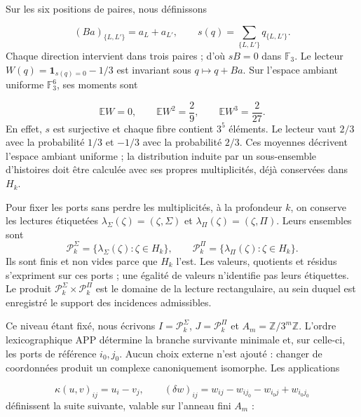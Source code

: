 Sur les six positions de paires, nous définissons

\[
(Ba)_{\{L,L'\}}=a_L+a_{L'},
\qquad
s(q)=\sum_{\{L,L'\}}q_{\{L,L'\}}.
\]
Chaque direction intervient dans trois paires ; d'où \(sB=0\) dans \(\mathbb F_3\). Le lecteur \(W(q)=\mathbf1_{s(q)=0}-1/3\) est invariant sous \(q\mapsto q+Ba\). Sur l'espace ambiant uniforme \(\mathbb F_3^6\), ses moments sont

\[
\mathbb EW=0,\qquad
\mathbb EW^2=\frac29,\qquad
\mathbb EW^3=\frac2{27}.
\]
En effet, \(s\) est surjective et chaque fibre contient \(3^5\) éléments. Le lecteur vaut \(2/3\) avec la probabilité \(1/3\) et \(-1/3\) avec la probabilité \(2/3\). Ces moyennes décrivent l'espace ambiant uniforme ; la distribution induite par un sous-ensemble d'histoires doit être calculée avec ses propres multiplicités, déjà conservées dans \(H_k\).

Pour fixer les ports sans perdre les multiplicités, à la profondeur \(k\), on conserve les lectures étiquetées \(\lambda_\Sigma(\zeta)=(\zeta,\Sigma)\) et \(\lambda_\Pi(\zeta)=(\zeta,\Pi)\). Leurs ensembles sont
\[
\mathscr P_k^\Sigma=\{\lambda_\Sigma(\zeta):\zeta\in H_k\},\qquad
\mathscr P_k^\Pi=\{\lambda_\Pi(\zeta):\zeta\in H_k\}.
\]
Ils sont finis et non vides parce que \(H_k\) l’est. Les valeurs, quotients et résidus
s’expriment sur ces ports ; une égalité de valeurs n’identifie pas leurs
étiquettes. Le produit \(\mathscr P_k^\Sigma\times\mathscr P_k^\Pi\) est le
domaine de la lecture rectangulaire, au sein duquel est enregistré le support des
incidences admissibles.


Ce niveau étant fixé, nous écrivons \(I=\mathscr P_k^\Sigma\), \(J=\mathscr P_k^\Pi\) et \(A_m=\mathbb Z/3^m\mathbb Z\). L'ordre lexicographique APP détermine la branche survivante minimale et, sur celle-ci, les ports de référence \(i_0,j_0\). Aucun choix externe n'est ajouté : changer de coordonnées produit un complexe canoniquement isomorphe. Les applications

\[
\kappa(u,v)_{ij}=u_i-v_j,
\qquad
(\delta w)_{ij}=w_{ij}-w_{ij_0}-w_{i_0j}+w_{i_0j_0}
\]
définissent la suite suivante, valable sur l'anneau fini \(A_m\) :

